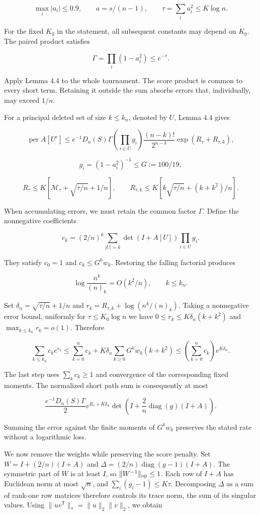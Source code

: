 \documentclass[11pt,a4paper]{article}
\begin{document}
\[
\max_i|a_i|\le0.9,\qquad
a=s/(n-1),\qquad \tau=\sum_i a_i^2\le K\log n.
\]

For the fixed \(K_0\) in the statement, all subsequent constants may depend on \(K_0\). The paired product satisfies

\[
\Gamma=\prod_i(1-a_i^2)\le e^{-\tau}.
\]

Apply Lemma 4.4 to the whole tournament. The score product is common to every short term. Retaining it outside the sum absorbs errors that, individually, may exceed \(1/n\).

For a principal deleted set of size \(k\le k_n\), denoted by \(U\), Lemma 4.4 gives

\[
\operatorname{per}A[U^c]\le
e^{-1}D_n(S)\Gamma
\left(\prod_{i\in U}g_i\right)
\frac{(n-k)!}{2^{n-k}}\exp(R_\tau+R_{\tau,k}),
\]

\[
g_i=(1-a_i^2)^{-1}\le G:=100/19,
\]

\[
R_\tau\le K[\mathcal M_\tau+\sqrt{\tau/n}+1/n],\qquad
R_{\tau,k}\le K[k\sqrt{\tau/n}+(k+k^2)/n].
\]

When accumulating errors, we must retain the common factor \(\Gamma\). Define the nonnegative coefficients

\[
c_k=(2/n)^k\sum_{|U|=k}\det(I+A[U])\prod_{i\in U}g_i.
\]

They satisfy \(c_0=1\) and \(c_k\le G^kw_k\). Restoring the falling factorial produces

\[
\log\frac{n^k}{(n)_k}=O(k^2/n),\qquad k\le k_n.
\]

Set \(\delta_n=\sqrt{\tau/n}+1/n\) and \(r_k=R_{\tau,k}+\log(n^k/(n)_k)\). Taking a nonnegative error bound, uniformly for \(\tau\le K_0\log n\) we have \(0\le r_k\le K\delta_n(k+k^2)\) and \(\max_{k\le k_n}r_k=o(1)\). Therefore

\[
\sum_{k\le k_n}c_ke^{r_k}
\le\sum_{k=0}^{n}c_k+
K\delta_n\sum_{k\ge0}G^kw_k(k+k^2)
\le\left(\sum_{k=0}^{n}c_k\right)e^{K\delta_n}.
\]

The last step uses \(\sum_kc_k\ge1\) and convergence of the corresponding fixed moments. The normalized short path sum is consequently at most

\[
\frac{e^{-1}D_n(S)\Gamma}{2}
e^{R_\tau+K\delta_n}
\det\left(I+\frac2n\operatorname{diag}(g)(I+A)\right).
\]

Summing the error against the finite moments of \(G^kw_k\) preserves the stated rate without a logarithmic loss.

We now remove the weights while preserving the score penalty. Set \(W=I+(2/n)(I+A)\) and \(\Delta=(2/n)\operatorname{diag}(g-1)(I+A)\). The symmetric part of \(W\) is at least \(I\), so \(\|W^{-1}\|_{\rm op}\le1\). Each row of \(I+A\) has Euclidean norm at most \(\sqrt n\), and \(\sum_i(g_i-1)\le K\tau\). Decomposing \(\Delta\) as a sum of rank-one row matrices therefore controls its trace norm, the sum of its singular values. Using \(\|uv^{\mathsf T}\|_*=\|u\|_2\|v\|_2\), we obtain
\end{document}
